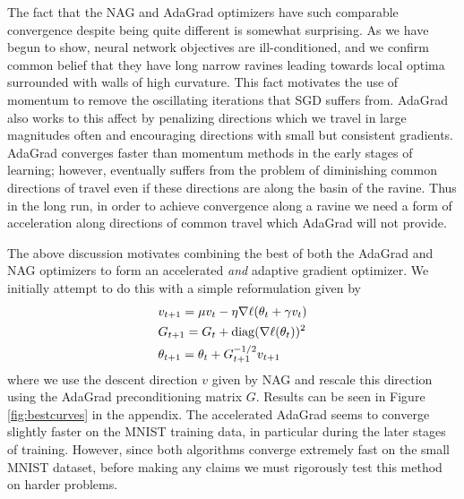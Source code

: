 The fact that the NAG and AdaGrad optimizers have such comparable convergence
despite being quite different is somewhat surprising. As we have begun to show,
neural network objectives are ill-conditioned, and we confirm common belief
that they have long narrow ravines leading towards local optima surrounded with
walls of high curvature. This fact motivates the use of momentum to remove the
oscillating iterations that SGD suffers from. AdaGrad also works to this affect
by penalizing directions which we travel in large magnitudes often and
encouraging directions with small but consistent gradients. AdaGrad converges
faster than momentum methods in the early stages of learning; however,
eventually suffers from the problem of diminishing common directions of travel
even if these directions are along the basin of the ravine. Thus in the long
run, in order to achieve convergence along a ravine we need a form of
acceleration along directions of common travel which AdaGrad will not provide. 

The above discussion motivates combining the best of both the AdaGrad and
NAG optimizers to form an accelerated {\it and} adaptive gradient optimizer. We
initially attempt to do this with a simple reformulation given by
\begin{align*}
&v_{t+1} = \mu v_t - \eta \nabla \ell (\theta_t + \gamma v_t) \\
&G_{t+1} = G_{t} + \operatorname*{diag}(\nabla \ell (\theta_t))^2 \\
&\theta_{t+1} = \theta_t + G_{t+1}^{-1/2} v_{t+1}
\end{align*}
where we use the descent direction $v$ given by NAG and rescale this direction
using the AdaGrad preconditioning matrix $G$. Results can be seen in Figure \ref{fig:bestcurves} 
in the appendix. The accelerated AdaGrad seems to converge slightly faster on
the MNIST training data, in particular during the later stages of training.
However, since both algorithms converge extremely fast on the small MNIST
dataset, before making any claims we must rigorously test this method on harder
problems.

